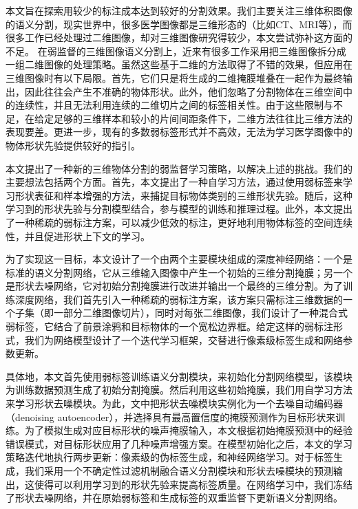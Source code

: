 本文旨在探索用较少的标注成本达到较好的分割效果。我们主要关注三维体积图像的语义分割，现实世界中，很多医学图像都是三维形态的（比如CT、MRI等），而很多工作已经处理过二维图像，却对三维图像研究得较少，本文尝试弥补这方面的不足。
在弱监督的三维图像语义分割上，近来有很多工作采用把三维图像拆分成一组二维图像的处理策略。虽然这些基于二维的方法取得了不错的效果，但应用在三维图像时有以下局限。首先，它们只是将生成的二维掩膜堆叠在一起作为最终输出，因此往往会产生不准确的物体形状\citep{kervadec2019constrained,kervadec2020bounding}。此外，他们忽略了分割物体在三维空间中的连续性，并且无法利用连续的二维切片之间的标签相关性。由于这些限制与不足，在给定足够的三维样本和较小的片间间距条件下\citep{baumgartner2017exploration}，二维方法往往比三维方法的表现要差。更进一步，现有的多数弱标签形式并不高效，无法为学习医学图像中的物体形状先验提供较好的指引。

本文提出了一种新的三维物体分割的弱监督学习策略，以解决上述的挑战。我们的主要想法包括两个方面。首先，本文提出了一种自学习方法，通过使用弱标签来学习形状表征和样本增强的方法，来捕捉目标物体类别的三维形状先验。随后，这种学习到的形状先验与分割模型结合，参与模型的训练和推理过程。此外，本文提出了一种稀疏的弱标注方案，可以减少低效的标注，更好地利用物体标签的空间连续性，并且促进形状上下文的学习。

为了实现这一目标，本文设计了一个由两个主要模块组成的深度神经网络：一个是标准的语义分割网络，它从三维输入图像中产生一个初始的三维分割掩膜；另一个是形状去噪网络，它对初始分割掩膜进行改进并输出一个最终的三维分割。为了训练深度网络，我们首先引入一种稀疏的弱标注方案，该方案只需标注三维数据的一个子集（即一部分二维图像切片），同时对每张二维图像，我们设计了一种混合式弱标签，它结合了前景涂鸦和目标物体的一个宽松边界框。给定这样的弱标注形式，我们为网络模型设计了一个迭代学习框架，交替进行像素级标签生成和网络参数更新。

具体地，本文首先使用弱标签训练语义分割模块，来初始化分割网络模型，该模块为训练数据预测生成了初始分割掩膜。然后利用这些初始掩膜，我们用自学习方法来学习形状去噪模块。为此，文中把形状去噪模块实例化为一个去噪自动编码器（denoising autoencoder）\citep{vincent2010stacked,Sundermeyer_2018_ECCV}，并选择具有最高置信度的掩膜预测作为目标形状来训练。为了模拟生成对应目标形状的噪声掩膜输入，本文根据初始掩膜预测中的经验错误模式，对目标形状应用了几种噪声增强方案。在模型初始化之后，本文的学习策略迭代地执行两步更新：像素级的伪标签生成，和神经网络学习。对于标签生成，我们采用一个不确定性过滤机制融合语义分割模块和形状去噪模块的预测输出，这使得可以利用学习到的形状先验来提高标签质量。在网络学习中，我们冻结了形状去噪网络，并在原始弱标签和生成标签的双重监督下更新语义分割网络。

